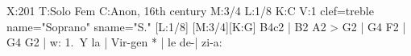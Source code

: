 X:201
T:Solo Fem
C:Anon, 16th century
M:3/4
L:1/8
K:C
V:1 clef=treble name="Soprano" sname="S."
[L:1/8] [M:3/4][K:G]
B4c2 | B2 A2 > G2 | G4 F2 | G4 G2 |
w: 1.~Y la | Vir-gen * | le de-| zi-a:
